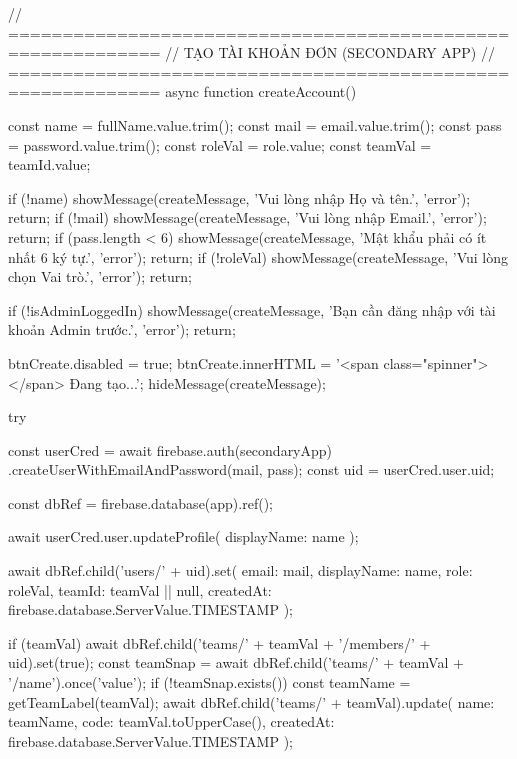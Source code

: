 {            // ============================================================
            // TẠO TÀI KHOẢN ĐƠN (SECONDARY APP)
            // ============================================================
            async function createAccount() {
                const name = fullName.value.trim();
                const mail = email.value.trim();
                const pass = password.value.trim();
                const roleVal = role.value;
                const teamVal = teamId.value;

                if (!name) { showMessage(createMessage, 'Vui lòng nhập Họ và tên.', 'error'); return; }
                if (!mail) { showMessage(createMessage, 'Vui lòng nhập Email.', 'error'); return; }
                if (pass.length < 6) { showMessage(createMessage, 'Mật khẩu phải có ít nhất 6 ký tự.', 'error'); return; }
                if (!roleVal) { showMessage(createMessage, 'Vui lòng chọn Vai trò.', 'error'); return; }

                if (!isAdminLoggedIn) {
                    showMessage(createMessage, 'Bạn cần đăng nhập với tài khoản Admin trước.', 'error');
                    return;
                }

                btnCreate.disabled = true;
                btnCreate.innerHTML = '<span class="spinner"></span> Đang tạo...';
                hideMessage(createMessage);

                try {
                    const userCred = await firebase.auth(secondaryApp)
                        .createUserWithEmailAndPassword(mail, pass);
                    const uid = userCred.user.uid;

                    const dbRef = firebase.database(app).ref();

                    await userCred.user.updateProfile({ displayName: name });

                    await dbRef.child('users/' + uid).set({
                        email: mail,
                        displayName: name,
                        role: roleVal,
                        teamId: teamVal || null,
                        createdAt: firebase.database.ServerValue.TIMESTAMP
                    });

                    if (teamVal) {
                        await dbRef.child('teams/' + teamVal + '/members/' + uid).set(true);
                        const teamSnap = await dbRef.child('teams/' + teamVal + '/name').once('value');
                        if (!teamSnap.exists()) {
                            const teamName = getTeamLabel(teamVal);
                            await dbRef.child('teams/' + teamVal).update({
                                name: teamName,
                                code: teamVal.toUpperCase(),
                                createdAt: firebase.database.ServerValue.TIMESTAMP
                            });
                        }
                    }

}}}
